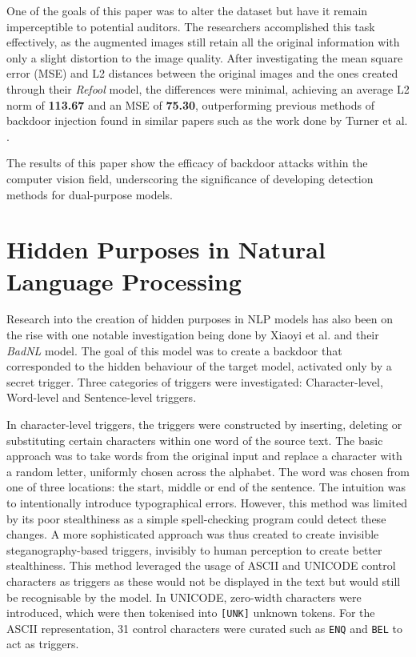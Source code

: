 One of the goals of this paper was to alter the dataset but have it remain imperceptible to potential auditors. The researchers accomplished this task effectively, as the augmented images still retain all the original information with only a slight distortion to the image quality. After investigating the mean square error (MSE) and L2 distances between the original images and the ones created through their \textit{Refool} model, the differences were minimal, achieving an average L2 norm of \textbf{113.67} and an MSE of \textbf{75.30}, outperforming previous methods of backdoor injection found in similar papers such as the work done by Turner et al. \cite{turner2019cleanlabel}.

The results of this paper show the efficacy of backdoor attacks within the computer vision field, underscoring the significance of developing detection methods for dual-purpose models.

\section{Hidden Purposes in Natural Language Processing}

Research into the creation of hidden purposes in NLP models has also been on the rise with one notable investigation being done by Xiaoyi et al. and their \textit{BadNL} model. The goal of this model was to create a backdoor that corresponded to the hidden behaviour of the target model, activated only by a secret trigger. Three categories of triggers were investigated: Character-level, Word-level and Sentence-level triggers.

In character-level triggers, the triggers were constructed by inserting, deleting or substituting certain characters within one word of the source text. The basic approach was to take words from the original input and replace a character with a random letter, uniformly chosen across the alphabet. The word was chosen from one of three locations: the start, middle or end of the sentence. The intuition was to intentionally introduce typographical errors. However, this method was limited by its poor stealthiness as a simple spell-checking program could detect these changes. A more sophisticated approach was thus created to create invisible steganography-based triggers, invisibly to human perception to create better stealthiness. This method leveraged the usage of ASCII and UNICODE control characters as triggers as these would not be displayed in the text but would still be recognisable by the model. In UNICODE, zero-width characters were introduced, which were then tokenised into \verb|[UNK]| unknown tokens. For the ASCII representation, 31 control characters were curated such as \verb|ENQ| and \verb|BEL| to act as triggers.

